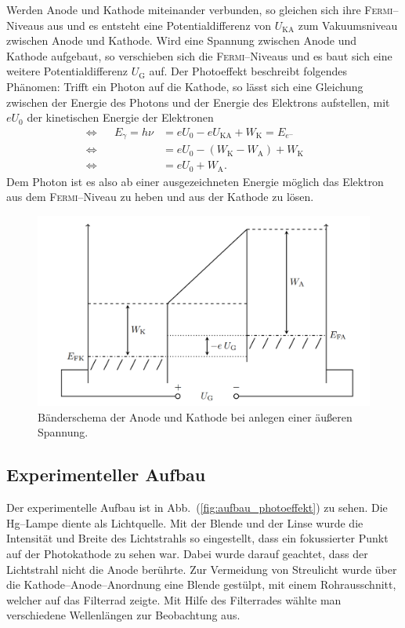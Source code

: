 \documentclass[sn-mathphys-num,iicol]{sn-jnl}
\theoremstyle{thmstyleone}
\theoremstyle{thmstyletwo}
\theoremstyle{thmstylethree}
\begin{document}
Werden Anode und Kathode miteinander verbunden, so gleichen sich ihre \textsc{Fermi}--Niveaus aus und es entsteht eine Potentialdifferenz von $U_\text{KA}$ zum Vakuumsniveau zwischen Anode und Kathode.
Wird eine Spannung zwischen Anode und Kathode aufgebaut, so verschieben sich die \textsc{Fermi}--Niveaus und es baut sich eine weitere Potentialdifferenz $U_\text{G}$ auf.
Der Photoeffekt beschreibt folgendes Phänomen: Trifft ein Photon auf die Kathode, so lässt sich eine Gleichung zwischen der Energie des Photons und der Energie des Elektrons aufstellen, mit $eU_0$ der kinetischen Energie der Elektronen
\begin{align} 
        \Leftrightarrow && E_\gamma =h\nu &=eU_0-eU_\text{KA}+W_\text{K}=E_{e^-}&&\\
        \Leftrightarrow &&&=eU_0-\left(W_\text{K}-W_\text{A}\right)+W_\text{K}&&\\
        \Leftrightarrow &&&=eU_0+W_\text{A}.&&
\end{align} 
Dem Photon ist es also ab einer ausgezeichneten Energie möglich das Elektron aus dem \textsc{Fermi}--Niveau zu heben und aus der Kathode zu lösen.
\begin{figure}[t]
        \centering
        \includegraphics[width=.5\textwidth]{402_austrittsarbeit.png}
        \caption{Bänderschema der Anode und Kathode bei anlegen einer äußeren Spannung.\cite{Anleitung402}} \label{fig:bänderschema}
\end{figure}

\subsection{Experimenteller Aufbau}
Der experimentelle Aufbau ist in Abb.\ (\ref{fig:aufbau_photoeffekt}) zu sehen.
Die Hg--Lampe diente als Lichtquelle.
Mit der Blende und der Linse wurde die Intensität und Breite des Lichtstrahls so eingestellt, dass ein fokussierter Punkt auf der Photokathode zu sehen war.
Dabei wurde darauf geachtet, dass der Lichtstrahl nicht die Anode berührte.
Zur Vermeidung von Streulicht wurde über die Kathode--Anode--Anordnung eine Blende gestülpt, mit einem Rohrausschnitt, welcher auf das Filterrad zeigte.
Mit Hilfe des Filterrades wählte man verschiedene Wellenlängen zur Beobachtung aus.
\end{document}
